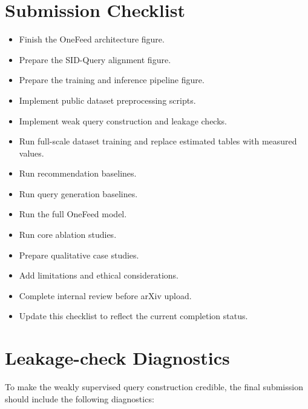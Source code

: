 \documentclass[11pt]{article}
\begin{document}



\appendix
\section{Submission Checklist}

\begin{itemize}
    \item Finish the OneFeed architecture figure.
    \item Prepare the SID-Query alignment figure.
    \item Prepare the training and inference pipeline figure.
    \item Implement public dataset preprocessing scripts.
    \item Implement weak query construction and leakage checks.
    \item Run full-scale dataset training and replace estimated tables with measured values.
    \item Run recommendation baselines.
    \item Run query generation baselines.
    \item Run the full OneFeed model.
    \item Run core ablation studies.
    \item Prepare qualitative case studies.
    \item Add limitations and ethical considerations.
    \item Complete internal review before arXiv upload.
    \item Update this checklist to reflect the current completion status.
\end{itemize}

\section{Leakage-check Diagnostics}

To make the weakly supervised query construction credible, the final submission should include the following diagnostics:
\end{document}
